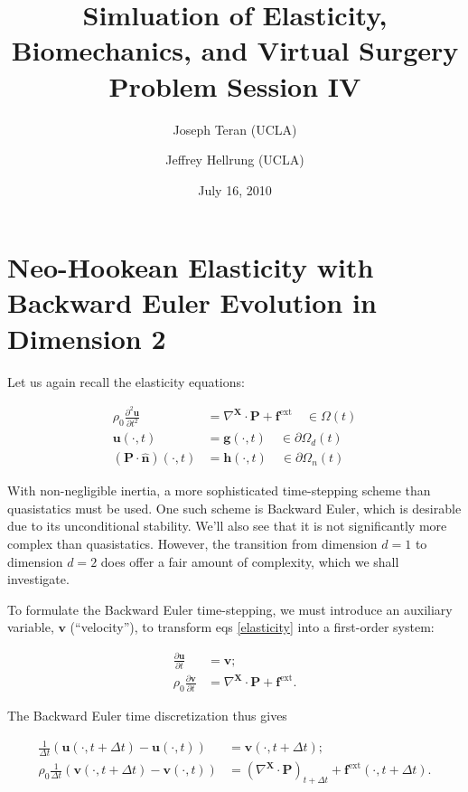 \documentclass{article}
\title{Simluation of Elasticity, Biomechanics, and Virtual Surgery \\
       Problem Session IV}
\date{July 16, 2010}
\author{Joseph Teran (UCLA) \and
        Jeffrey Hellrung (UCLA)}
\begin{document}
\maketitle

\section{Neo-Hookean Elasticity with Backward Euler Evolution in Dimension 2}

Let us again recall the elasticity equations:

\begin{subequations}\label{elasticity}
\begin{align}
\rho_0 \frac{\partial^2 \mathbf{u}}{\partial t^2} & = \nabla^{\mathbf{X}} \cdot \mathbf{P} + \mathbf{f}^{\text{ext}} \quad \in \Omega(t) \\
\mathbf{u}(\cdot,t) & = \mathbf{g}(\cdot,t) \quad \in \partial \Omega_d(t) \\
\left( \mathbf{P} \cdot \mathbf{\hat{n}} \right) (\cdot,t) & = \mathbf{h}(\cdot,t) \quad \in \partial \Omega_n(t)
\end{align}
\end{subequations}

With non-negligible inertia, a more sophisticated time-stepping scheme than quasistatics must be used.  One such scheme is Backward Euler, which is desirable due to its unconditional stability.  We'll also see that it is not significantly more complex than quasistatics.  However, the transition from dimension \(d = 1\) to dimension \(d = 2\) does offer a fair amount of complexity, which we shall investigate.

To formulate the Backward Euler time-stepping, we must introduce an auxiliary variable, \(\mathbf{v}\) (``velocity''), to transform eqs \eqref{elasticity} into a first-order system:

\begin{subequations}
\begin{align}
\frac{\partial \mathbf{u}}{\partial t} & = \mathbf{v}; \\
\rho_0 \frac{\partial \mathbf{v}}{\partial t} & = \nabla^{\mathbf{X}} \cdot \mathbf{P} + \mathbf{f}^{\text{ext}}.
\end{align}
\end{subequations}

The Backward Euler time discretization thus gives

\begin{subequations}\label{backwardeuleri}
\begin{align}
\frac{1}{\Delta t} \left( \mathbf{u} \left( \cdot, t + \Delta t \right) - \mathbf{u}(\cdot,t) \right) & = \mathbf{v} \left( \cdot, t + \Delta t \right); \\
\rho_0 \frac{1}{\Delta t} \left( \mathbf{v} \left( \cdot, t + \Delta t \right) - \mathbf{v}(\cdot,t) \right) & = \left( \nabla^{\mathbf{X}} \cdot \mathbf{P} \right)_{t + \Delta t} + \mathbf{f}^{\text{ext}} \left( \cdot, t + \Delta t \right).
\end{align}
\end{subequations}
\end{document}
